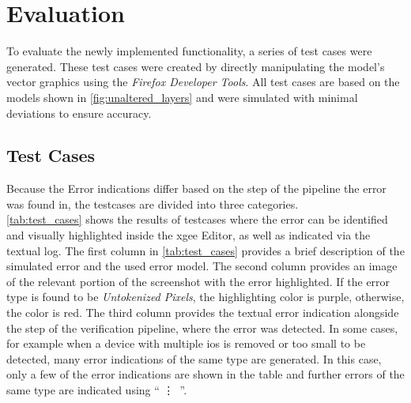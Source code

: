 \chapter{Evaluation}
\label{chap:evaluation}

To evaluate the newly implemented functionality, a series of test cases were generated. These test cases were created by directly manipulating the model's vector graphics using the \textit{Firefox Developer Tools}. All test cases are based on the models shown in \autoref{fig:unaltered_layers} and were simulated with minimal deviations to ensure accuracy.

\section{Test Cases}
Because the Error indications differ based on the step of the pipeline the error was found in, the testcases are divided into three categories.\\
\autoref{tab:test_cases} shows the results of testcases where the error can be identified and visually highlighted inside the \acrshort{xgee} Editor, as well as indicated via the textual log. The first column in \autoref{tab:test_cases} provides a brief description of the simulated error and the used error model. The second column provides an image of the relevant portion of the screenshot with the error highlighted. If the error type is found to be \textit{Untokenized Pixels}, the highlighting color is purple, otherwise, the color is red. The third column provides the textual error indication alongside the step of the verification pipeline, where the error was detected. In some cases, for example when a device with multiple \acrshort{io}s is removed or too small to be detected, many error indications of the same type are generated. In this case, only a few of the error indications are shown in the table and further errors of the same type are indicated using `` \vdots\ ''.


